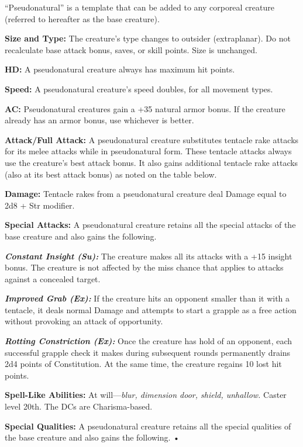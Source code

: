 \documentclass{article}
\begin{document}
{``Pseudonatural'' is a template that can be added to any corporeal creature (referred 
to hereafter as the base creature). 

\textbf{Size and Type: }The creature's type changes to outsider (extraplanar). 
Do not recalculate base attack bonus, saves, or skill points. Size is unchanged.

\textbf{HD: }A pseudonatural creature always has maximum hit points. 

\textbf{Speed:} A pseudonatural creature's speed doubles, for all movement types. 

\textbf{AC:} Pseudonatural creatures gain a +35 natural armor bonus. If the creature 
already has an armor bonus, use whichever is better. 

\textbf{Attack/Full Attack:} A pseudonatural creature substitutes tentacle rake 
attacks for its melee attacks while in pseudonatural form. These tentacle attacks 
always use the creature's best attack bonus.  It also gains additional tentacle 
rake attacks (also at its best attack bonus) as noted on the table below.

\textbf{Damage:} Tentacle rakes from a pseudonatural creature deal Damage equal 
to 2d8 + Str modifier. 

\textbf{Special Attacks:} A pseudonatural creature retains all the special attacks 
of the base creature and also gains the following. 

\textit{\textbf{Constant Insight (Su):}}\textit{ }The creature makes all its attacks 
with a +15 insight bonus. The creature is not affected by the miss chance that 
applies to attacks against a concealed target. 

\textit{\textbf{Improved Grab (Ex):}}\textit{ }If the creature hits an opponent 
smaller than it with a tentacle, it deals normal Damage and attempts to start a 
grapple as a free action without provoking an attack of opportunity. 

\textit{\textbf{Rotting Constriction (Ex):}}\textit{ }Once the creature has hold 
of an opponent, each successful grapple check it makes during subsequent rounds 
permanently drains 2d4 points of Constitution. At the same time, the creature regains 
10 lost hit points. 

\textbf{Spell-Like Abilities: }At will---\textit{blur, dimension door, shield, 
unhallow. }Caster level 20th.  The DCs are Charisma-based.

\textbf{Special Qualities:} A pseudonatural creature retains all the special qualities 
of the base creature and also gains the following. • 

}
\end{document}

